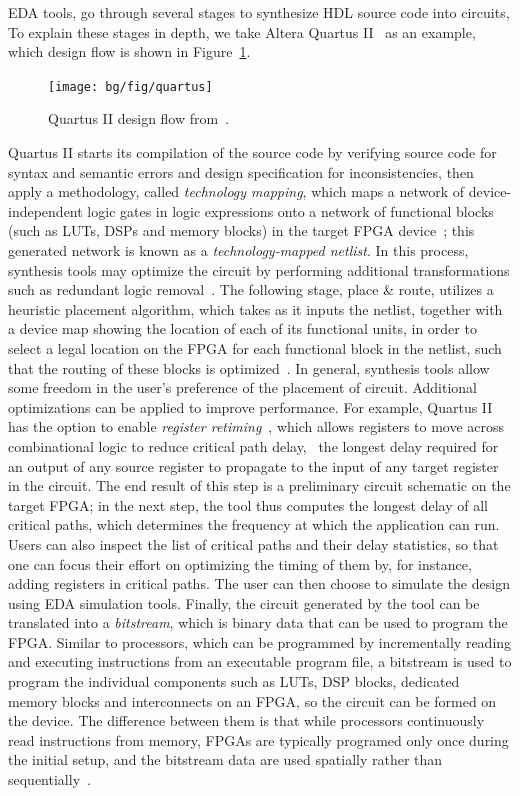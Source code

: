 EDA tools, go through several stages to synthesize HDL source code
into circuits, To explain these stages in depth, we take Altera
Quartus II~\cite{quartus} as an example, which design flow is shown in
Figure~\ref{fig:quartus}.
\begin{figure}[ht]
    \centering
    \texttt{[image: bg/fig/quartus]}
    \caption{Quartus II design flow from~\cite{quartus}.}\label{fig:quartus}
\end{figure}

Quartus II starts its compilation of the source code by verifying source code
for syntax and semantic errors and design specification for inconsistencies,
then apply a methodology, called \emph{technology mapping}, which maps
a network of device-independent logic gates in logic expressions onto a
network of functional blocks (such as LUTs, DSPs and memory blocks) in
the target FPGA device~\cite{cong08}; this generated network is known as
a \emph{technology-mapped netlist}.  In this process, synthesis tools may
optimize the circuit by performing additional transformations such as redundant
logic removal~\cite{quartus}.  The following stage, place \& route, utilizes a
heuristic placement algorithm, which takes as it inputs the netlist, together
with a device map showing the location of each of its functional units, in
order to select a legal location on the FPGA for each functional block in the
netlist, such that the routing of these blocks is optimized~\cite{betz08}.  In
general, synthesis tools allow some freedom in the user's preference of the
placement of circuit.  Additional optimizations can be applied to improve
performance.  For example, Quartus II has the option to enable \emph{register
retiming}~\cite{quartus}, which allows registers to move across combinational
logic to reduce critical path delay, \ie~the longest delay required for
an output of any source register to propagate to the input of any target
register in the circuit.  The end result of this step is a preliminary circuit
schematic on the target FPGA\@; in the next step, the tool thus computes
the longest delay of all critical paths, which determines the frequency at
which the application can run.  Users can also inspect the list of critical
paths and their delay statistics, so that one can focus their effort on
optimizing the timing of them by, for instance, adding registers in critical
paths.  The user can then choose to simulate the design using EDA simulation
tools.  Finally, the circuit generated by the tool can be translated into a
\emph{bitstream}, which is binary data that can be used to program the FPGA\@.
Similar to processors, which can be programmed by incrementally reading and
executing instructions from an executable program file, a bitstream is used
to program the individual components such as LUTs, DSP blocks, dedicated
memory blocks and interconnects on an FPGA, so the circuit can be formed on
the device.  The difference between them is that while processors continuously
read instructions from memory, FPGAs are typically programed only once during
the initial setup, and the bitstream data are used spatially rather than
sequentially~\cite{guccione08}.
